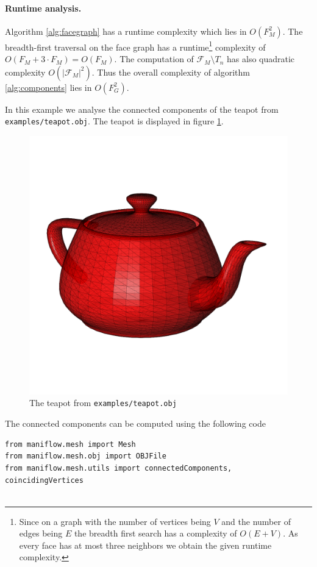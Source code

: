 \paragraph{Runtime analysis.} Algorithm \ref{alg:facegraph} has a runtime complexity which lies in $O(F_M^2)$. The breadth-first traversal on the face graph has a runtime\footnote{Since on a graph with the number of vertices being $V$ and the number of edges being $E$ the breadth first search has a complexity of $O(E + V)$. As every face has at most three neighbors we obtain the given runtime complexity.} complexity of $O(F_M + 3\cdot F_M) = O(F_M)$. The computation of $\mathcal{F}_M\setminus T_n$ has also quadratic complexity $O(\vert\mathcal{F}_M\vert^2)$. Thus the overall complexity of algorithm \ref{alg:components} lies in $O(F_G^2)$.
\begin{ex}
    In this example we analyse the connected components of the teapot from \texttt{examples/teapot.obj}. The teapot is displayed in figure \ref{fig:teapot}.
    \begin{figure}[h]
        \centering
        \includegraphics[scale=0.15]{img/teapot.png}
        \caption{The teapot from \texttt{examples/teapot.obj}}
        \label{fig:teapot}
    \end{figure}
    \newline\noindent The connected components can be computed using the following code
    \begin{lstlisting}[label={lst:teapot_four_components}]
from maniflow.mesh import Mesh
from maniflow.mesh.obj import OBJFile
from maniflow.mesh.utils import connectedComponents, coincidingVertices


\end{lstlisting}
\end{ex}
